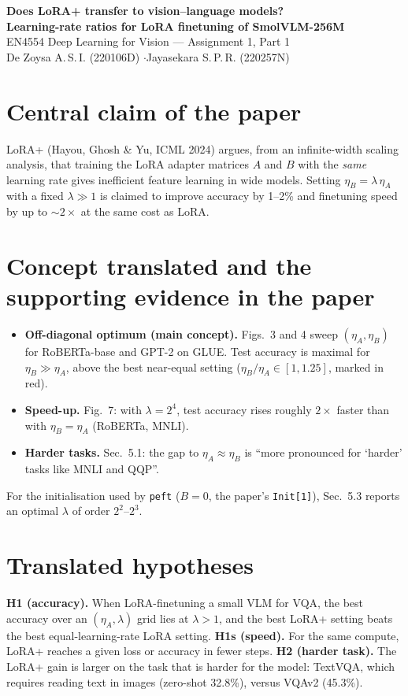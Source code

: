 \documentclass[10pt,a4paper]{article}
\newcommand{\etaA}{\eta_A}
\newcommand{\etaB}{\eta_B}
\begin{document}
\begin{center}
{\large\bfseries Does LoRA+ transfer to vision--language models?\\[1pt]
Learning-rate ratios for LoRA finetuning of SmolVLM-256M}\\[4pt]
{\small EN4554 Deep Learning for Vision --- Assignment 1, Part 1}\\[1pt]
{\small De Zoysa A.\,S.\,I. (220106D) \quad$\cdot$\quad Jayasekara S.\,P.\,R. (220257N)}
\end{center}
\vspace{-4pt}
\suppressfloats[t]

\section{Central claim of the paper}
LoRA+ (Hayou, Ghosh \& Yu, ICML 2024) argues, from an infinite-width scaling analysis, that training the LoRA
adapter matrices $A$ and $B$ with the \emph{same} learning rate gives inefficient feature learning in wide models.
Setting $\etaB=\lambda\,\etaA$ with a fixed $\lambda\gg1$ is claimed to improve accuracy by 1--2\% and finetuning
speed by up to ${\sim}2\times$ at the same cost as LoRA.

\section{Concept translated and the supporting evidence in the paper}
\begin{itemize}
\item \textbf{Off-diagonal optimum (main concept).} Figs.~3 and 4 sweep $(\etaA,\etaB)$ for RoBERTa-base and GPT-2 on GLUE.
Test accuracy is maximal for $\etaB\gg\etaA$, above the best near-equal setting ($\etaB/\etaA\in[1,1.25]$, marked in red).
\item \textbf{Speed-up.} Fig.~7: with $\lambda=2^4$, test accuracy rises roughly $2\times$ faster than with $\etaB=\etaA$ (RoBERTa, MNLI).
\item \textbf{Harder tasks.} Sec.~5.1: the gap to $\etaA\approx\etaB$ is ``more pronounced for `harder' tasks like MNLI and QQP''.
\end{itemize}
For the initialisation used by \texttt{peft} ($B=0$, the paper's \texttt{Init[1]}), Sec.~5.3 reports an optimal $\lambda$ of order $2^2$--$2^3$.

\section{Translated hypotheses}
\textbf{H1 (accuracy).} When LoRA-finetuning a small VLM for VQA, the best accuracy over an $(\etaA,\lambda)$ grid lies at
$\lambda>1$, and the best LoRA+ setting beats the best equal-learning-rate LoRA setting.
\textbf{H1s (speed).} For the same compute, LoRA+ reaches a given loss or accuracy in fewer steps.
\textbf{H2 (harder task).} The LoRA+ gain is larger on the task that is harder for the model: TextVQA, which requires reading
text in images (zero-shot 32.8\%), versus VQAv2 (45.3\%).
\end{document}
